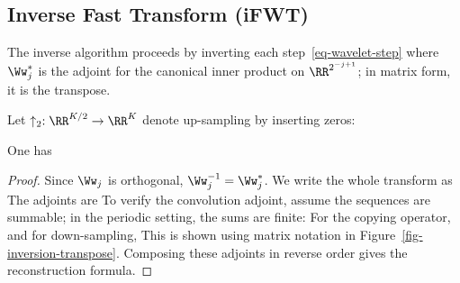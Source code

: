\subsection{Inverse Fast Transform (iFWT)}

The inverse algorithm proceeds by inverting each step~\eqref{eq-wavelet-step}
where $\Ww_j^{*}$ is the adjoint for the canonical inner product on $\RR^{2^{-j+1}}$; in matrix form, it is the transpose.

Let $\uparrow_2 : \RR^{K/2} \rightarrow \RR^K$ denote up-sampling by inserting zeros:

\begin{prop}
One has
\end{prop}

\begin{proof}
Since $\Ww_j$ is orthogonal, $\Ww_j^{-1} = \Ww_j^*$.
%
We write the whole transform as 
The adjoints are
To verify the convolution adjoint, assume the sequences are summable; in the periodic setting, the sums are finite:
For the copying operator,
and for down-sampling,
This is shown using matrix notation in Figure~\ref{fig-inversion-transpose}.
%
Composing these adjoints in reverse order gives the reconstruction formula.
\end{proof}



